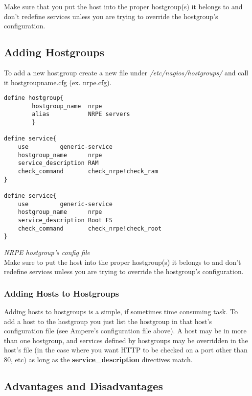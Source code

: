 \documentclass[a4paper]{article}
\begin{document}
Make sure that you put the host into the proper  hostgroup(s) it belongs to and don't redefine services unless you are trying to override the hostgroup's configuration.

\subsection{Adding Hostgroups}
\label{sec:hostgroups}

To add a new hostgroup create a new file under \textit{/etc/nagios/hostgroups/} and call it hostgroupname.cfg (ex. nrpe.cfg).
\\

\begin{lstlisting}[language=nagconf]
define hostgroup{
        hostgroup_name  nrpe
        alias           NRPE servers
        }

define service{
	use			generic-service
	hostgroup_name		nrpe
	service_description	RAM
	check_command		check_nrpe!check_ram
}

define service{
	use			generic-service
	hostgroup_name		nrpe
	service_description	Root FS
	check_command		check_nrpe!check_root
}

\end{lstlisting}
\hfill \textit{NRPE hostgroup's config file}\\

Make sure to put the host into the proper hostgroup(s) it belongs to and don't redefine services unless you are trying to override the hostgroup's configuration.

\subsubsection{Adding Hosts to Hostgroups}

Adding hosts to hostgroups is a simple, if sometimes time consuming task. To add a host to the hostgroup you just list the hostgroup in that host's configuration file (see Ampere's configuration file above). A host may be in more than one hostgroup, and services defined by hostgroups may be overridden in the host's file (in the case where you want HTTP to be checked on a port other than 80, etc) as long as the \textbf{service\_description} directives match.

\subsection{Advantages and Disadvantages}
\end{document}
